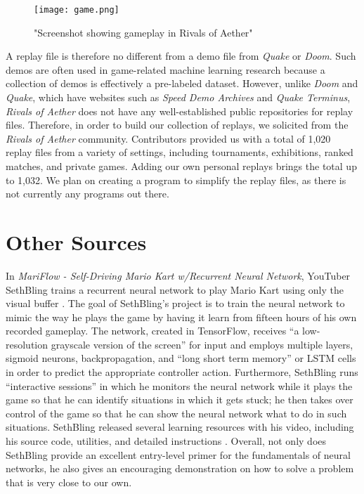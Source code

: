 \begin{figure}
	\caption{"Screenshot showing gameplay in Rivals of Aether"}
	\centering
	\texttt{[image: game.png]} \\
\end{figure}

A replay file is therefore no different from a demo file from {\it Quake} or {\it Doom}. Such demos are often used in game-related machine learning research because a collection of demos is effectively a pre-labeled dataset. However, unlike {\it Doom} and {\it Quake}, which have websites such as {\it Speed Demo Archives} and {\it Quake Terminus}, {\it Rivals of Aether} does not have any well-established public repositories for replay files. Therefore, in order to build our collection of replays, we solicited from the {\it Rivals of Aether} community. Contributors provided us with a total of 1,020 replay files from a variety of settings, including tournaments, exhibitions, ranked matches, and private games. Adding our own personal replays brings the total up to 1,032. We plan on creating a program to simplify the replay files, as there is not currently any programs out there.




\section{Other Sources}

In {\it MariFlow - Self-Driving Mario Kart w/Recurrent Neural Network}, YouTuber SethBling trains a recurrent neural network to play Mario Kart using only the visual buffer \cite{SethBling:2017}. The goal of SethBling's project is to train the neural network to mimic the way he plays the game by having it learn from fifteen hours of his own recorded gameplay. The network, created in TensorFlow, receives ``a low-resolution grayscale version of the screen'' for input and employs multiple layers, sigmoid neurons, backpropagation, and ``long short term memory'' or LSTM cells in order to predict the appropriate controller action. Furthermore, SethBling runs ``interactive sessions'' in which he monitors the neural network while it plays the game so that he can identify situations in which it gets stuck; he then takes over control of the game so that he can show the neural network what to do in such situations. SethBling released several learning resources with his video, including his source code, utilities, and detailed instructions \cite{SethBling:2017}. Overall, not only does SethBling provide an excellent entry-level primer for the fundamentals of neural networks, he also gives an encouraging demonstration on how to solve a problem that is very close to our own.

